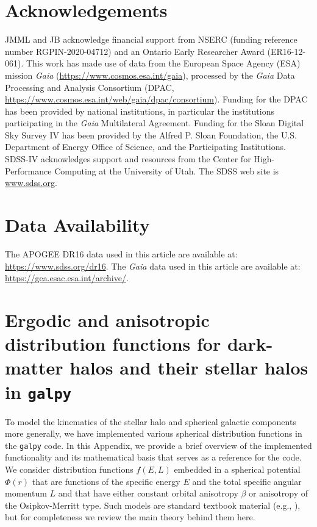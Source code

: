 \section*{Acknowledgements}

JMML and JB acknowledge financial support from NSERC (funding reference number RGPIN-2020-04712) and an Ontario Early Researcher Award (ER16-12-061). This work has made use of data from the European Space Agency (ESA) mission
{\it Gaia} (\url{https://www.cosmos.esa.int/gaia}), processed by the {\it Gaia}
Data Processing and Analysis Consortium (DPAC,
\url{https://www.cosmos.esa.int/web/gaia/dpac/consortium}). Funding for the DPAC
has been provided by national institutions, in particular the institutions
participating in the {\it Gaia} Multilateral Agreement. Funding for the Sloan Digital Sky Survey IV has been provided by the Alfred P. Sloan Foundation, the U.S. Department of Energy Office of Science, and the Participating Institutions. SDSS-IV acknowledges support and resources from the Center for High-Performance Computing at the University of Utah. The SDSS web site is \url{www.sdss.org}.

\section*{Data Availability}
 
The APOGEE DR16 data used in this article are available at: \url{https://www.sdss.org/dr16}. The \textit{Gaia} data used in this article are available at: \url{https://gea.esac.esa.int/archive/}.







\appendix

\section{Ergodic and anisotropic distribution functions for dark-matter halos and their stellar halos in \lowercase{\texttt{galpy}}}\label{dfappendix}

To model the kinematics of the stellar halo and spherical galactic components more generally, we have implemented various spherical distribution functions in the \texttt{galpy} code. In this Appendix, we provide a brief overview of the implemented functionality and its mathematical basis that serves as a reference for the code. We consider distribution functions $f(E,L)$ embedded in a spherical potential $\Phi(r)$ that are functions of the specific energy $E$ and the total specific angular momentum $L$ and that have either constant orbital anisotropy $\beta$ or anisotropy of the Osipkov-Merritt type. Such models are standard textbook material (e.g., \citealt{binney08}), but for completeness we review the main theory behind them here.

